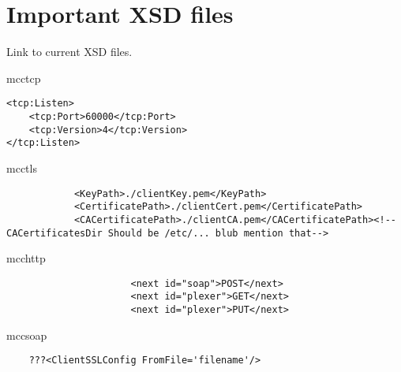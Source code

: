\section{Important XSD files}


Link to current XSD files.

    mcctcp\\
\begin{verbatim}
<tcp:Listen>
	<tcp:Port>60000</tcp:Port>
	<tcp:Version>4</tcp:Version>
</tcp:Listen>
\end{verbatim}
    mcctls\\
\begin{verbatim}
 			<KeyPath>./clientKey.pem</KeyPath>
			<CertificatePath>./clientCert.pem</CertificatePath>
			<CACertificatePath>./clientCA.pem</CACertificatePath><!-- CACertificatesDir Should be /etc/... blub mention that-->

\end{verbatim}

    mcchttp\\
\begin{verbatim}
                      <next id="soap">POST</next>
                      <next id="plexer">GET</next>
                      <next id="plexer">PUT</next>
\end{verbatim}
    mccsoap\\
\begin{verbatim}
	???<ClientSSLConfig FromFile='filename'/>  
\end{verbatim}




